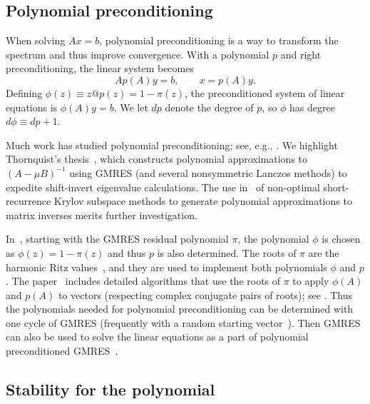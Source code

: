 \documentclass{siamart}
\begin{document}
\subsection{Polynomial preconditioning} \label{ssec:ppgmres}

When solving $Ax = b$, polynomial preconditioning is a way to transform the spectrum and thus improve convergence.
With a polynomial $p$ and right preconditioning, the linear system becomes 
\begin{equation}
Ap(A)y = b, \qquad x = p(A)y. \label{eqn:ppsys}
\end{equation}
Defining $\phi(z) \equiv z@ p(z)=1-\pi(z)$, the preconditioned system of linear equations is 
$\phi(A)y = b.$  
We let $dp$ denote the degree of $p$, so $\phi$ has degree $d\phi \equiv dp+1$.  

Much work has studied polynomial preconditioning; see, e.g., \cite{seed,As87,AsMaOt,PPArn,FiRe,Jo,La52B,LiXiVeYaSa,PPG,PPGStable,Rutis,Sa84b,Sa87b,Sa03,SmSa,Sti58,Tho06,vGi95,YeXiSa}.  We highlight Thornquist's thesis~\cite{Tho06}, which constructs polynomial approximations to $(A-\mu B)^{-1}$ using GMRES (and several nonsymmetric Lanczos methods) to expedite shift-invert eigenvalue calculations.  The use in~\cite{Tho06} of non-optimal short-recurrence Krylov subspace methods to generate polynomial approximations to matrix inverses merits further investigation.

In~\cite{PPArn,PPGStable}, starting with the GMRES residual polynomial $\pi$, the polynomial $\phi$ is chosen as $\phi(z) = 1 - \pi(z)$ and thus $p$ is also determined.  The roots of $\pi$ are the harmonic Ritz values~\cite{IE,IEN,PaPavdV}, and they are used to implement both polynomials $\phi$ and $p$.  
The paper~\cite{PPGStable} includes detailed algorithms that use the roots of $\pi$ to apply $\phi(A)$ and $p(A)$ to vectors (respecting complex conjugate pairs of roots); see \cite[alg.~1 and alg.~3]{PPGStable}.  Thus the polynomials needed for polynomial preconditioning can be determined with one cycle of GMRES (frequently with a random starting vector~\cite{PPGStable}).  Then GMRES can also be used to solve the linear equations as a part of polynomial preconditioned GMRES~\cite[alg.~4]{PPGStable}.  

\subsection{Stability for the polynomial}  \label{ssec:rev2}
\end{document}
